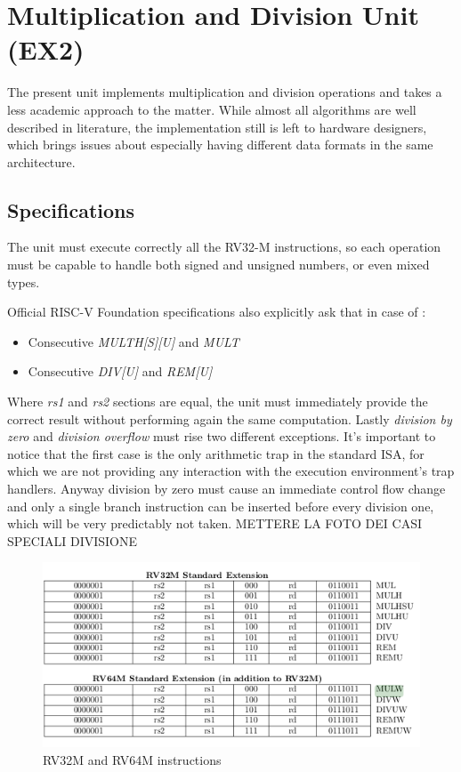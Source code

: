\section{Multiplication and Division Unit (EX2)}
The present unit implements multiplication and division operations and takes a less academic approach to the matter. While almost all algorithms are well described in literature, the implementation still is left to hardware designers, which brings issues about especially having different data formats in the same architecture.
\subsection{Specifications}
The unit must execute correctly all the RV32-M instructions, so each operation must be capable to handle both signed and unsigned numbers, or even mixed types.

Official RISC-V Foundation specifications also explicitly ask that in case of :
\begin{itemize}
    \item Consecutive \textit{MULTH[S][U]} and \textit{MULT} 
    \item Consecutive \textit{DIV[U]} and \textit{REM[U]}
\end{itemize}
Where \textit{rs1} and \textit{rs2} sections are equal, the unit must immediately provide the correct result without performing again the same computation.
Lastly \textit{division by zero} and \textit{division overflow} must rise two different exceptions. It's important to notice that the first case is the only arithmetic trap in the standard ISA, for which we are not providing any interaction with the execution environment’s trap handlers. Anyway division by zero must cause an immediate control flow change and only a single branch instruction can be inserted before every division one, which will be very predictably not taken.
METTERE LA FOTO DEI CASI SPECIALI DIVISIONE
\newpage
\begin{figure}[H]
    \centering
    \includegraphics[scale=0.7]{pics/complete.png}
    \caption{RV32M and RV64M instructions}
    \label{fig:my_label}
\end{figure}
